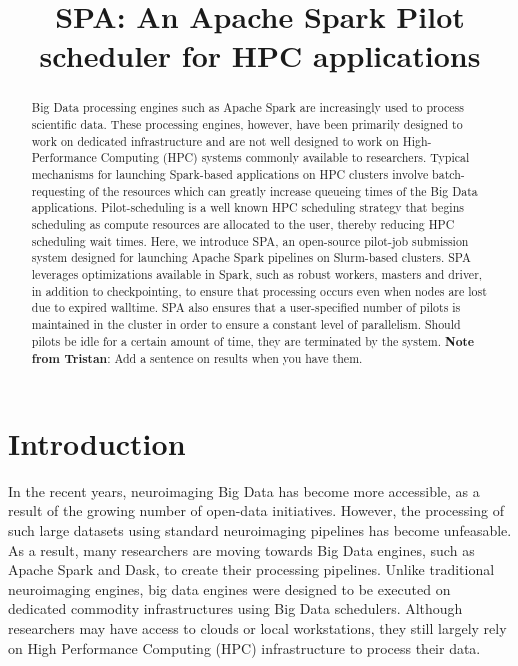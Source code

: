 \documentclass{IEEEtran}
\newcommand{\tristan}[1]{\color{red}\textbf{Note from Tristan}:
      #1 \color{black}}
\begin{document}
\title{SPA: An Apache Spark Pilot scheduler for HPC applications}
\author{
    \IEEEauthorblockA{}
}
\maketitle

\begin{abstract}
    Big Data processing engines such as Apache Spark are increasingly 
    used to process scientific data. These processing engines, however, 
    have been primarily designed to work on dedicated infrastructure 
    and are not well designed to work on High-Performance Computing 
    (HPC) systems commonly available to researchers. Typical mechanisms 
    for launching Spark-based applications on HPC clusters involve 
    batch-requesting of the resources which can greatly increase 
    queueing times of the Big Data 
    applications. Pilot-scheduling is a well known HPC scheduling
    strategy that begins scheduling as compute resources are allocated to the 
    user, thereby reducing HPC scheduling wait times. Here, we introduce SPA, an
    open-source
    pilot-job submission system designed for launching Apache Spark pipelines 
    on Slurm-based clusters. SPA leverages optimizations available in Spark, 
    such as robust workers, masters and driver, in addition to 
    checkpointing, to ensure that processing occurs even when nodes are 
    lost due to expired walltime. SPA also ensures that a 
    user-specified number of pilots is maintained in the cluster in 
    order to ensure a constant level of parallelism. Should pilots be 
    idle for a certain amount of time, they are terminated by 
    the system. \tristan{Add a sentence on results when you have them.}

\end{abstract}

\section{Introduction}

In the recent years, neuroimaging Big Data has become more accessible, as a
result of the growing number of open-data initiatives\cite{openneuro, hcp, ukbiobank}. However, the
processing of such large datasets using standard neuroimaging pipelines has 
become unfeasable. As a result, many researchers are moving towards Big Data 
engines, such as Apache Spark and Dask\cite{spark, dask}, to create their processing pipelines. 
Unlike traditional neuroimaging engines, big data engines were designed to be 
executed on dedicated commodity infrastructures using Big Data schedulers. Although
researchers may have access to clouds or local workstations, they still largely 
rely on High Performance Computing (HPC) infrastructure to process their data.
\end{document}
